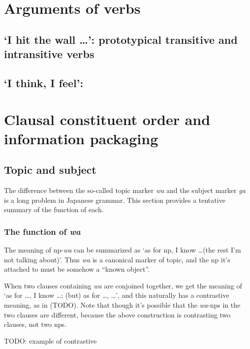 \documentclass[UTF8, a4paper, oneside, scheme=plain]{ctexrep}
\newcommand{\corpus}[1]{\emph{#1}}
\newcommand{\translate}[1]{`#1'}
\begin{document}
\chapter{Arguments of verbs}\label{chap:arguments}

\section{\translate{I hit the wall \dots}: prototypical transitive and intransitive verbs}

\section{\translate{I think, I feel}: }

\chapter{Clausal constituent order and information packaging}

\section{Topic and subject}\label{sec:topic-subject}

The difference between the so-called topic marker \corpus{wa} and the subject marker \corpus{ga}
is a long problem in Japanese grammar.
This section provides a tentative summary of the function of each.

\subsection{The function of \corpus{wa}}

The meaning of \ac{np}-\corpus{wa} can be summarized as 
\translate{as for \ac{np}, I know \dots (the rest I'm not talking about)}.
Thus \corpus{wa} is a canonical marker of topic,
and the \ac{np} it's attached to must be somehow a ``known object''.

When two clauses containing \corpus{wa} are conjoined together,
we get the meaning of 
\translate{as for \dots, I know \dots; (but) as for \dots, \dots},
and this naturally has a contrastive meaning, as in (TODO).
Note that though it's possible that the \corpus{wa}-\ac{np}s in the two clauses are different,
because the above construction is contrasting two clauses, not two \ac{np}s.

\begin{exe}
    \ex TODO: example of contrastive  
\end{exe}
\end{document}
